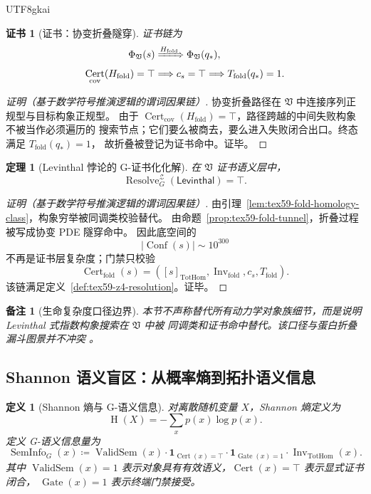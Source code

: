 \documentclass[12pt]{article}
\newtheorem{definition}{定义}[section]
\newtheorem{theorem}{定理}[section]
\newtheorem{remark}{备注}[section]
\newtheorem{Certificate}{证书}[section]
\newcommand{\Vsys}{\mathfrak V}
\newcommand{\DefEq}{\coloneqq}
\DeclareMathOperator{\Cert}{Cert}
\DeclareMathOperator{\Resolve}{Resolve}
\DeclareMathOperator{\Gate}{Gate}
\DeclareMathOperator{\Inv}{Inv}
\DeclareMathOperator{\TotHom}{TotHom}
\DeclareMathOperator{\ValidSem}{ValidSem}
\DeclareMathOperator{\Conf}{Conf}
\DeclareMathOperator{\Entropy}{H}
\DeclareMathOperator{\SemInfo}{SemInfo}
\begin{document}
\begin{CJK*}{UTF8}{gkai}
\begin{Certificate}[证书：协变折叠隧穿]
\label{cert:tex59-fold-tunnel}
证书链为
\[
  \begin{aligned}
  \Phi_{\Vsys}(s)
  &\xRightarrow{H_{\mathrm{fold}}}
  \Phi_{\Vsys}(q_\ast),\\
  \Cert_{\mathrm{cov}}(H_{\mathrm{fold}})=\top
  &\Longrightarrow
  c_s=\top
  \Longrightarrow
  T_{\mathrm{fold}}(q_\ast)=1.
  \end{aligned}
\]
\end{Certificate}

\begin{proof}[证明（基于数学符号推演逻辑的谓词因果链）]
协变折叠路径在 \(\Vsys\) 中连接序列正规型与目标构象正规型。
由于 \(\Cert_{\mathrm{cov}}(H_{\mathrm{fold}})=\top\)，路径跨越的中间失败构象不被当作必须遍历的
搜索节点；它们要么被商去，要么进入失败闭合出口。终态满足 \(T_{\mathrm{fold}}(q_\ast)=1\)，
故折叠被登记为证书命中。证毕。
\end{proof}

\begin{theorem}[Levinthal 悖论的 G-证书化化解]
\label{thm:tex59-levinthal-resolution}
在 \(\Vsys\) 证书语义层中，
\[
  \Resolve_G^{\mathcal Z}(\mathsf{Levinthal})=\top.
\]
\end{theorem}

\begin{proof}[证明（基于数学符号推演逻辑的谓词因果链）]
由引理~\ref{lem:tex59-fold-homology-class}，构象穷举被同调类校验替代。
由命题~\ref{prop:tex59-fold-tunnel}，折叠过程被写成协变 PDE 隧穿命中。
因此底空间的
\[
  |\Conf(s)|\sim 10^{300}
\]
不再是证书层复杂度；门禁只校验
\[
  \Cert_{\mathrm{fold}}(s)
  =
  ([s]_{\TotHom},\Inv_{\mathrm{fold}},c_s,T_{\mathrm{fold}}).
\]
该链满足定义~\ref{def:tex59-z4-resolution}。证毕。
\end{proof}

\begin{remark}[生命复杂度口径边界]
本节不声称替代所有动力学对象族细节，而是说明 Levinthal 式指数构象搜索在 \(\Vsys\) 中被
同调类和证书命中替代。该口径与蛋白折叠漏斗图景并不冲突 \cite{DillMacCallum2012ProteinFolding}。
\end{remark}

\subsection{Shannon 语义盲区：从概率熵到拓扑语义信息}
\label{subsec:tex59-shannon-semantic}

\begin{definition}[Shannon 熵与 G-语义信息]
\label{def:tex59-semantic-info-measure}
对离散随机变量 \(X\)，Shannon 熵定义为
\[
  \Entropy(X)
  =
  -\sum_x p(x)\log p(x).
\]
定义 G-语义信息量为
\[
  \SemInfo_G(x)
  \DefEq
  \ValidSem(x)\cdot
  \mathbf 1_{\Cert(x)=\top}\cdot
  \mathbf 1_{\Gate(x)=1}\cdot
  \Inv_{\TotHom}(x).
\]
其中 \(\ValidSem(x)=1\) 表示对象具有有效语义，\(\Cert(x)=\top\) 表示显式证书闭合，
\(\Gate(x)=1\) 表示终端门禁接受。
\end{definition}


\end{CJK*}
\end{document}
